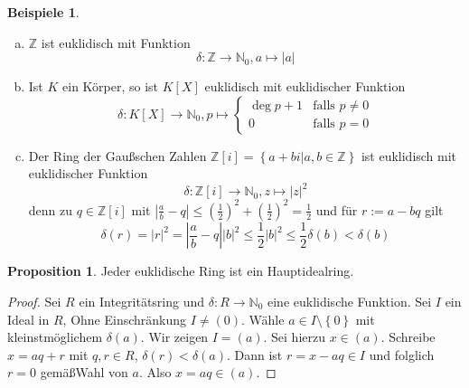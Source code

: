 \documentclass[
twoside=semi,
fontsize=12,
DIV=12, 
cleardoublepage=current,
leqno,
headings=optiontoheadandtoc, 
toc=idx
]{scrbook}
\newcommand{\N}{\mathbb{N}}
\newcommand{\Z}{\mathbb{Z}}
\newcommand{\brac}[1]{\left( #1 \right)}
\newcommand{\set}[1]{\left\{ #1 \right\}}
\theoremstyle{definition}
\newtheorem{beispiele}[definition]{Beispiele}
\newtheorem{proposition}[definition]{Proposition}
\begin{document}
	\begin{beispiele}\label{1.6.2}
		\begin{enumerate}[(a)]
			\item $\Z$ ist euklidisch mit Funktion 
				\[\delta: \Z \to \N_0, a \mapsto |a|\]
			\item Ist $K$ ein K\"orper, so ist $K[X]$ euklidisch mit euklidischer Funktion 
				\[\delta:K[X]\to\N_0, p \mapsto \begin{cases}
					\deg p + 1 & \textrm{falls } p \neq 0\\
					0 & \textrm{falls } p = 0
				\end{cases}\]
			\item Der Ring der Gaußschen Zahlen $\Z[i] = \set{a+bi|a,b \in \Z}$ ist euklidisch mit euklidischer Funktion 
				\[\delta: \Z[i] \to \N_0, z \mapsto |z|^2\]
			denn zu $q \in \Z[i]$ mit $\left| \frac{a}{b} - q\right| \leq \brac{\frac{1}{2}}^2 + \brac{\frac{1}{2}}^2 = \frac{1}{2}$ und f\"ur $r:= a - bq$ gilt 
				\[\delta(r) = |r|^2 = \left| \frac{a}{b} - q\right||b|^2 \leq \frac{1}{2}|b|^2 \leq \frac{1}{2}\delta(b) < \delta(b)\]
		\end{enumerate}
	\end{beispiele}

	\begin{proposition}\label{1.6.3}
		Jeder euklidische Ring ist ein Hauptidealring.
		
		\begin{proof}
			Sei $R$ ein Integrit\"atsring und $\delta:R\to\N_0$ eine euklidische Funktion. Sei $I$ ein Ideal in $R$, Ohne Einschr\"ankung $I \neq (0)$. W\"ahle $a \in I\setminus\set{0}$
			mit kleinstm\"oglichem $\delta(a)$. Wir zeigen $I= (a)$. Sei hierzu $x\in (a)$. Schreibe $x = aq+r$ mit $q,r \in R$, $\delta(r)< \delta(a)$. Dann ist $r = x-aq \in I$ und folglich $r=0$ gem\"a\ss Wahl von $a$. Also $x = aq \in (a)$.
		\end{proof}
	\end{proposition}
\end{document}
